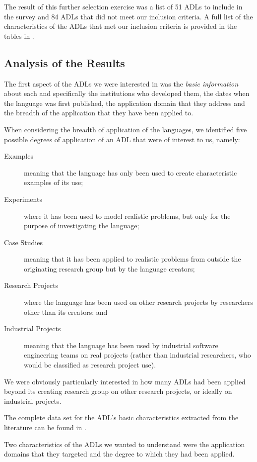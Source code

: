 The result of this further selection exercise was a list of 51 ADLs to include in the survey and 84 ADLs that did not meet our inclusion criteria.  A full list of the characteristics of the ADLs that met our inclusion criteria is provided in the tables in .

\subsection{Analysis of the Results}

The first aspect of the ADLs we were interested in was the \emph{basic information} about each and specifically the institutions who developed them, the dates when the language was first published, the application domain that they address and the breadth of the application that they have been applied to.

When considering the breadth of application of the languages, we identified five possible degrees of application of an ADL that were of interest to us, namely:
\begin{description}
	\item [Examples] meaning that the language has only been used to create characteristic examples of its use;
	\item [Experiments] where it has been used to model realistic problems, but only for the purpose of investigating the language;
	\item [Case Studies] meaning that it has been applied to realistic problems from outside the originating research group but by the language creators;
	\item [Research Projects] where the language has been used on other research projects by researchers other than its creators; and
	\item[Industrial Projects] meaning that the language has been used by industrial software engineering teams on real projects (rather than industrial researchers, who would be classified as research project use).
\end{description}

We were obviously particularly interested in how many ADLs had been applied beyond its creating research group on other research projects, or ideally on industrial projects.

The complete data set for the ADL's basic characteristics extracted from the literature can be found in .

Two characteristics of the ADLs we wanted to understand were the application domains that they targeted and the degree to which they had been applied.

